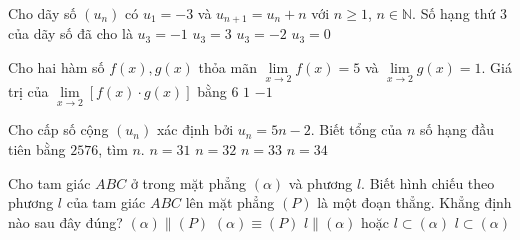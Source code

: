 \begin{ex}%
	Cho dãy số $(u_n)$ có $u_1=-3$ và $u_{n+1}=u_n+n$ với $n\ge 1$, $n\in \mathbb{N}$. Số hạng thứ $3$ của dãy số đã cho là
	\choice
	{$u_3=-1$}
	{$u_3=3$}
	{$u_3=-2$}
	{\True $u_3=0$}
\end{ex}

\begin{ex}%
	Cho hai hàm số $f\left(x\right),g\left(x\right)$ thỏa mãn ${\mathop{\lim}\limits_{x\to 2}} f\left(x\right)=5$ và ${\mathop{\lim}\limits_{x\to 2}} g\left(x\right)=1$. Giá trị của ${\mathop{\lim}\limits_{x\to 2}} \left[f\left(x\right)\cdot g\left(x\right)\right]$ bằng
	{$6$}
	{$1$}
	{$-1$}
\end{ex}

\begin{ex}%
	Cho cấp số cộng $\left(u_n\right)$ xác định bởi $u_n=5n-2$. Biết tổng của $n$ số hạng đầu tiên bằng $2576$, tìm $n$.
	\choice
	{$n=31$}
	{\True $n=32$}
	{$n=33$}
	{$n=34$}
\end{ex}

\begin{ex}%
	Cho tam giác $ABC$ ở trong mặt phẳng $\left(\alpha \right)$ và phương $l$. Biết hình chiếu theo phương $l$ của tam giác $ABC$ lên mặt phẳng $\left(P\right)$ là một đoạn thẳng. Khẳng định nào sau đây đúng?
	\choice
	{$\left(\alpha \right)\parallel \left(P\right)$}
	{$\left(\alpha \right)\equiv \left(P\right)$}
	{\True $l \parallel \left(\alpha \right)$ hoặc $l \subset \left(\alpha \right)$}
	{$l\subset \left(\alpha \right)$}
\end{ex}

